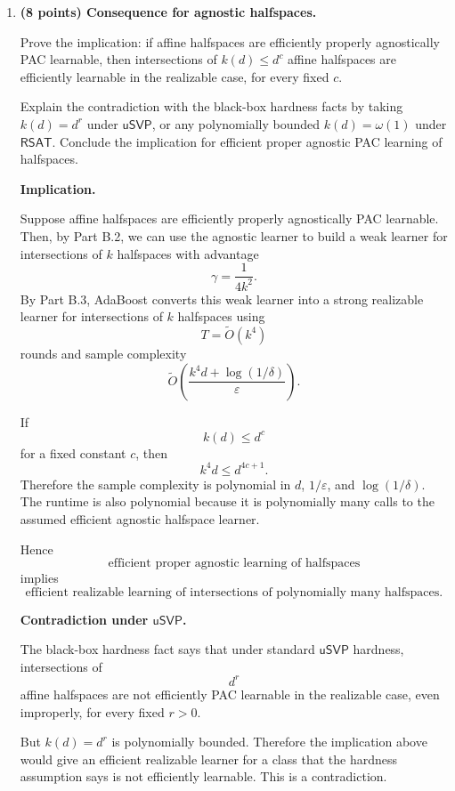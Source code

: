 \documentclass[11pt]{article}
\newcommand{\eps}{\varepsilon}
\begin{document}
\begin{enumerate}
    \item \textbf{(8 points) Consequence for agnostic halfspaces.}

    Prove the implication: if affine halfspaces are efficiently properly agnostically PAC learnable, then intersections of $k(d)\le d^c$ affine halfspaces are efficiently learnable in the realizable case, for every fixed $c$.

    Explain the contradiction with the black-box hardness facts by taking $k(d)=d^r$ under $\mathsf{uSVP}$, or any polynomially bounded $k(d)=\omega(1)$ under $\mathsf{RSAT}$. Conclude the implication for efficient proper agnostic PAC learning of halfspaces.

    \begin{solutionbox}
    \textbf{Implication.}

    Suppose affine halfspaces are efficiently properly agnostically PAC learnable. Then, by
    Part B.2, we can use the agnostic learner to build a weak learner for intersections of
    $k$ halfspaces with advantage
    \[
    \gamma=\frac{1}{4k^2}.
    \]
    By Part B.3, AdaBoost converts this weak learner into a strong realizable learner for
    intersections of $k$ halfspaces using
    \[
    T=\widetilde O(k^4)
    \]
    rounds and sample complexity
    \[
    \widetilde O\left(
    \frac{k^4d+\log(1/\delta)}{\eps}
    \right).
    \]

    If
    \[
    k(d)\le d^c
    \]
    for a fixed constant $c$, then
    \[
    k^4d\le d^{4c+1}.
    \]
    Therefore the sample complexity is polynomial in $d$, $1/\eps$, and $\log(1/\delta)$.
    The runtime is also polynomial because it is polynomially many calls to the assumed efficient
    agnostic halfspace learner.

    Hence
    \[
    \boxed{
    \text{efficient proper agnostic learning of halfspaces}
    }
    \]
    implies
    \[
    \boxed{
    \text{efficient realizable learning of intersections of polynomially many halfspaces.}
    }
    \]

    \medskip

    \textbf{Contradiction under $\mathsf{uSVP}$.}

    The black-box hardness fact says that under standard $\mathsf{uSVP}$ hardness, intersections
    of
    \[
    d^r
    \]
    affine halfspaces are not efficiently PAC learnable in the realizable case, even improperly,
    for every fixed $r>0$.

    But $k(d)=d^r$ is polynomially bounded. Therefore the implication above would give an
    efficient realizable learner for a class that the hardness assumption says is not efficiently
    learnable. This is a contradiction.


\end{solutionbox}
\end{enumerate}
\end{document}
